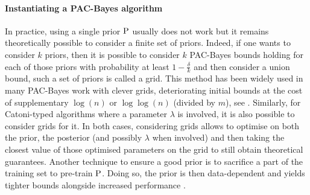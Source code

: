 \paragraph{Instantiating a PAC-Bayes algorithm}
  In practice, using a single prior $\P$ usually does not work but it remains theoretically possible to consider a finite set of priors. Indeed, if one wants to consider $k$ priors, then it is possible to consider $k$ PAC-Bayes bounds holding for each of those priors with probability at least $1-\frac{\delta}{k}$ and then consider a union bound, such a set of priors is called a grid. This method has been widely used in many PAC-Bayes work with clever grids, deteriorating initial bounds at the cost of supplementary $\log(n)$ or $\log\log(n)$ (divided by $m$), see \eg \citet{alquier2024user}. 
  Similarly, for Catoni-typed algorithms where a parameter $\lambda$ is involved, it is also possible to consider grids for it. In both cases, considering grids allows to optimise on both the prior, the posterior (and possibly $\lambda$ when involved) and then taking the closest value of those optimised parameters on the grid to still obtain theoretical guarantees. Another technique to ensure a good prior is to sacrifice a part of the training set to pre-train $\P$. 
  Doing so, the prior is then data-dependent and yields tighter bounds alongside increased performance \citep{perez2021tighter}.


